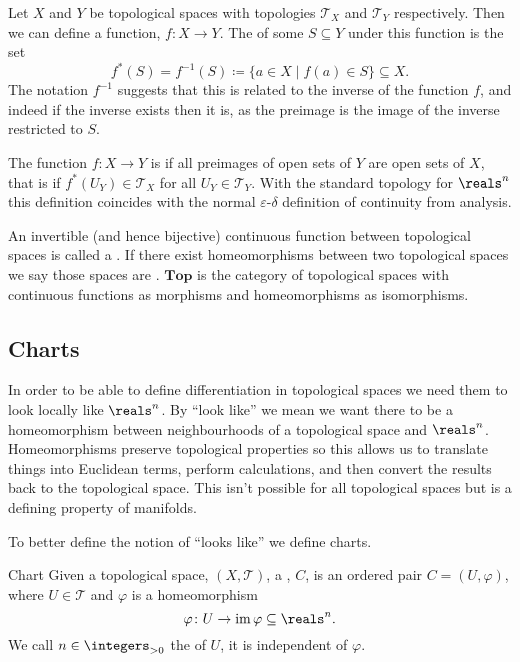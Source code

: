 \documentclass[fleqn]{NotesClass}
\newcommand*{\category}[1]{\mathbf{#1}}
\begin{document}
    Let \(X\) and \(Y\) be topological spaces with topologies \(\mathcal{T}_X\) and \(\mathcal{T}_Y\) respectively.
    Then we can define a function, \(f \colon X \to Y\).
    The  of some \(S \subseteq Y\) under this function is the set
    \begin{equation}
        f^*(S) = f^{-1}(S) \coloneqq \{a \in X \mid f(a) \in S\} \subseteq X.
    \end{equation}
    The notation \(f^{-1}\) suggests that this is related to the inverse of the function \(f\), and indeed if the inverse exists then it is, as the preimage is the image of the inverse restricted to \(S\).
    
    The function \(f \colon X \to Y\) is  if all preimages of open sets of \(Y\) are open sets of \(X\), that is if \(f^*(U_Y) \in \mathcal{T}_X\) for all \(U_Y \in \mathcal{T}_Y\).
    With the standard topology for \(\reals^n\) this definition coincides with the normal \(\varepsilon\)-\(\delta\) definition of continuity from analysis.
    
    An invertible (and hence bijective) continuous function between topological spaces is called a .
    If there exist homeomorphisms between two topological spaces we say those spaces are .
    \(\category{Top}\) is the category of topological spaces with continuous functions as morphisms and homeomorphisms as isomorphisms.
    
    \subsection{Charts}
    In order to be able to define differentiation in topological spaces we need them to look locally like \(\reals^n\).
    By \enquote{look like} we mean we want there to be a homeomorphism between neighbourhoods of a topological space and \(\reals^n\).
    Homeomorphisms preserve topological properties so this allows us to translate things into Euclidean terms, perform calculations, and then convert the results back to the topological space.
    This isn't possible for all topological spaces but is a defining property of manifolds.
    
    To better define the notion of \enquote{looks like} we define charts.
    
    \begin{dfn}{Chart}{}
        Given a topological space, \((X, \mathcal{T})\), a , \(C\), is an ordered pair \(C = (U, \varphi)\), where \(U \in \mathcal{T}\) and \(\varphi\) is a homeomorphism
        \begin{equation}
            \varphi \colon U \to \mathop{\mathrm{im}}\varphi \subseteq \reals^n.
        \end{equation}
        We call \(n \in \integers_{>0}\) the  of \(U\), it is independent of \(\varphi\).
    \end{dfn}
    
\end{document}
